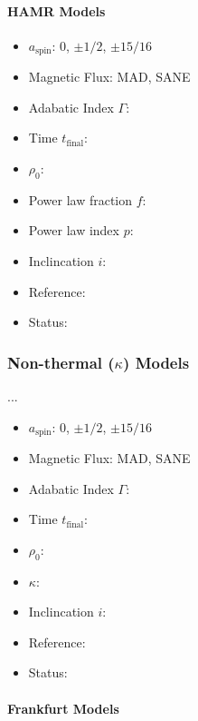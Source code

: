 \documentclass[twocolumn,twocolappendix,tighten,dvipsnames,linenumbers]{aastex63}
\begin{document}
\paragraph{HAMR Models}

\begin{itemize}
\item $a_\mathrm{spin}$: 0, $\pm1/2$, $\pm15/16$
\item Magnetic Flux: MAD, SANE
\item Adabatic Index $\Gamma$:
\item Time $t_\mathrm{final}$:
\item $\rho_0$:
\item Power law fraction $f$:
\item Power law index $p$:
\item Inclincation $i$:
\item Reference:
\item Status:
\end{itemize}

\subsubsection{Non-thermal ($\kappa$) Models}

...

\begin{itemize}
\item $a_\mathrm{spin}$: 0, $\pm1/2$, $\pm15/16$
\item Magnetic Flux: MAD, SANE
\item Adabatic Index $\Gamma$:
\item Time $t_\mathrm{final}$:
\item $\rho_0$:
\item $\kappa$:
\item Inclincation $i$:
\item Reference:
\item Status:
\end{itemize}

\paragraph{Frankfurt Models}
\end{document}
